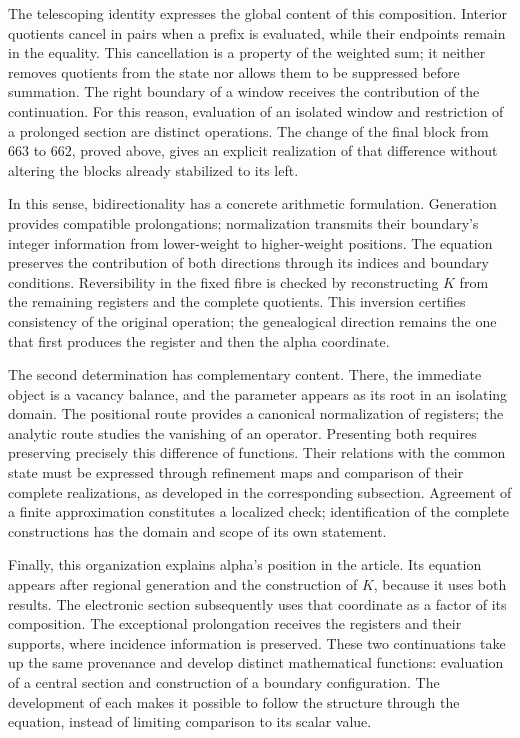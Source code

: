 The telescoping identity expresses the global content of this composition.
Interior quotients cancel in pairs when a prefix is evaluated,
while their endpoints remain in the equality. This cancellation is a
property of the weighted sum; it neither removes quotients from the state nor
allows them to be suppressed before summation. The right boundary of a
window receives the contribution of the continuation. For this reason,
evaluation of an isolated window and restriction of a prolonged
section are distinct operations. The change of the final block from $663$ to
$662$, proved above, gives an explicit realization of that
difference without altering the blocks already stabilized to its left.

In this sense, bidirectionality has a concrete arithmetic
formulation. Generation provides compatible prolongations;
normalization transmits their boundary's integer information from
lower-weight to higher-weight positions. The equation preserves the
contribution of both directions through its indices and boundary
conditions. Reversibility in the fixed fibre is checked by reconstructing
$K$ from the remaining registers and the complete quotients. This
inversion certifies consistency of the original operation; the genealogical
direction remains the one that first produces the register and then
the alpha coordinate.

The second determination has complementary content. There, the
immediate object is a vacancy balance, and the parameter appears as
its root in an isolating domain. The positional route provides a
canonical normalization of registers; the analytic route studies the vanishing
of an operator. Presenting both requires preserving precisely
this difference of functions. Their relations with the common state must
be expressed through refinement maps and comparison of
their complete realizations, as developed in the corresponding
subsection. Agreement of a finite approximation constitutes a
localized check; identification of the complete constructions
has the domain and scope of its own statement.

Finally, this organization explains alpha's position in the article.
Its equation appears after regional generation and the construction
of $K$, because it uses both results. The electronic section subsequently uses
that coordinate as a factor of its composition. The exceptional
prolongation receives the registers and their supports, where incidence
information is preserved. These two continuations take up the same
provenance and develop distinct mathematical functions: evaluation of
a central section and construction of a boundary configuration.
The development of each makes it possible to follow the structure through the
equation, instead of limiting comparison to its scalar value.
